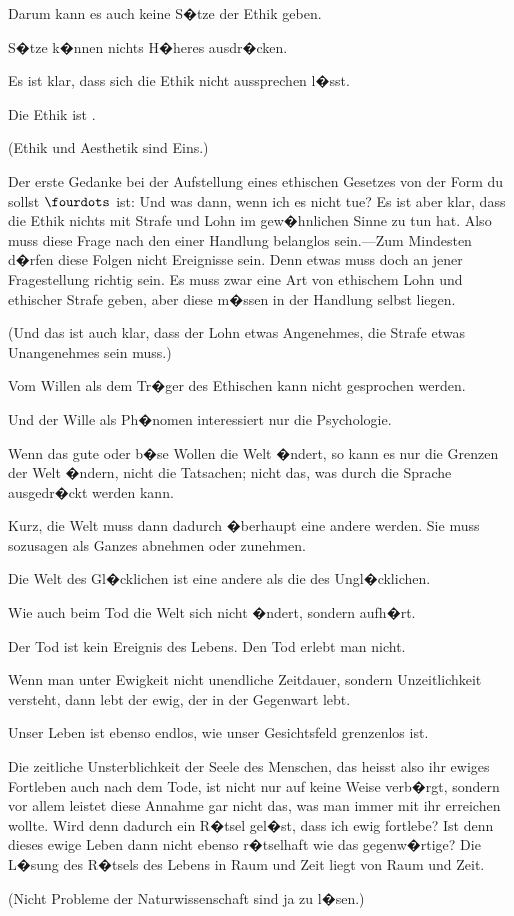 {Darum kann es auch keine S�tze der Ethik geben.

S�tze k�nnen nichts H�heres ausdr�cken.}


{Es ist klar, dass sich die Ethik nicht aussprechen
l�sst.

Die Ethik ist .

(Ethik und Aesthetik sind Eins.)}


{Der erste Gedanke bei der Aufstellung eines
ethischen Gesetzes von der Form \glqq{}du sollst $\fourdots$\grqq{}
ist: Und was dann, wenn ich es nicht tue? Es ist
aber klar, dass die Ethik nichts mit Strafe und
Lohn im gew�hnlichen Sinne zu tun hat. Also
muss diese Frage nach den  einer Handlung
belanglos sein.---Zum Mindesten d�rfen diese
Folgen nicht Ereignisse sein. Denn etwas muss
doch an jener Fragestellung richtig sein. Es muss
zwar eine Art von ethischem Lohn und ethischer
Strafe geben, aber diese m�ssen in der Handlung
selbst liegen.

(Und das ist auch klar, dass der Lohn etwas
Angenehmes, die Strafe etwas Unangenehmes sein
muss.)}


{Vom Willen als dem Tr�ger des Ethischen kann
nicht gesprochen werden.

Und der Wille als Ph�nomen interessiert nur
die Psychologie.}


{Wenn das gute oder b�se Wollen die Welt
�ndert, so kann es nur die Grenzen der Welt �ndern,
nicht die Tatsachen; nicht das, was durch die
Sprache ausgedr�ckt werden kann.

Kurz, die Welt muss dann dadurch �berhaupt
eine andere werden. Sie muss sozusagen als
Ganzes abnehmen oder zunehmen.

Die Welt des Gl�cklichen ist eine andere als die
des Ungl�cklichen.}


{Wie auch beim Tod die Welt sich nicht �ndert,
sondern aufh�rt.}


{Der Tod ist kein Ereignis des Lebens. Den
Tod erlebt man nicht.

Wenn man unter Ewigkeit nicht unendliche
Zeitdauer, sondern Unzeitlichkeit versteht, dann
lebt der ewig, der in der Gegenwart lebt.

Unser Leben ist ebenso endlos, wie unser
Gesichtsfeld grenzenlos ist.}


{Die zeitliche Unsterblichkeit der Seele des
Menschen, das heisst also ihr ewiges Fortleben
auch nach dem Tode, ist nicht nur auf keine Weise
verb�rgt, sondern vor allem leistet diese Annahme
gar nicht das, was man immer mit ihr erreichen
wollte. Wird denn dadurch ein R�tsel gel�st, dass
ich ewig fortlebe? Ist denn dieses ewige Leben
dann nicht ebenso r�tselhaft wie das gegenw�rtige?
Die L�sung des R�tsels des Lebens in Raum und
Zeit liegt  von Raum und Zeit.

(Nicht Probleme der Naturwissenschaft sind ja
zu l�sen.)}


